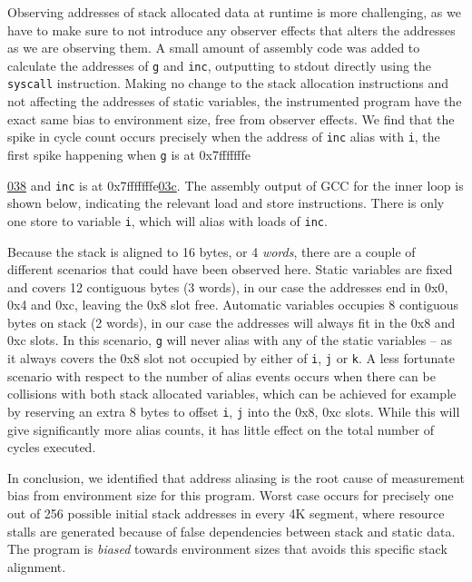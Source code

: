 \documentclass[prodmode,acmtaco]{acmsmall}
\begin{document}
Observing addresses of stack allocated data at runtime is more challenging, as we have to make sure to not introduce any observer effects that alters the addresses as we are observing them.
A small amount of assembly code was added to calculate the addresses of \texttt{g} and \texttt{inc}, outputting to stdout directly using the \texttt{syscall} instruction.
Making no change to the stack allocation instructions and not affecting the addresses of static variables, the instrumented program have the exact same bias to environment size, free from observer effects.
We find that the spike in cycle count occurs precisely when the address of \texttt{inc} alias with \texttt{i}, the first spike happening when \texttt{g} is at 0x7fffffffe{\underline{038} and \texttt{inc} is at 0x7fffffffe{\underline{03c}}.
The assembly output of {\small GCC} for the inner loop is shown below, indicating the relevant load and store instructions.
There is only one store to variable \texttt{i}, which will alias with loads of \texttt{inc}.



Because the stack is aligned to 16 bytes, or 4 \emph{words}, there are a couple of different scenarios that could have been observed here.
Static variables are fixed and covers 12 contiguous bytes (3 words), in our case the addresses end in 0x0, 0x4 and 0xc, leaving the 0x8 slot free.
Automatic variables occupies 8 contiguous bytes on stack (2 words), in our case the addresses will always fit in the 0x8 and 0xc slots.
In this scenario, \texttt{g} will never alias with any of the static variables -- as it always covers the 0x8 slot not occupied by either of \texttt{i}, \texttt{j} or \texttt{k}.
A less fortunate scenario with respect to the number of alias events occurs when there can be collisions with both stack allocated variables, which can be achieved for example by reserving an extra 8 bytes to offset \texttt{i}, \texttt{j} into the 0x8, 0xc slots. 
While this will give significantly more alias counts, it has little effect on the total number of cycles executed.

In conclusion, we identified that address aliasing is the root cause of measurement bias from environment size for this program.
Worst case occurs for precisely one out of 256 possible initial stack addresses in every 4K segment, where resource stalls are generated because of false dependencies between stack and static data.
The program is \emph{biased} towards environment sizes that avoids this specific stack alignment.


}
\end{document}
